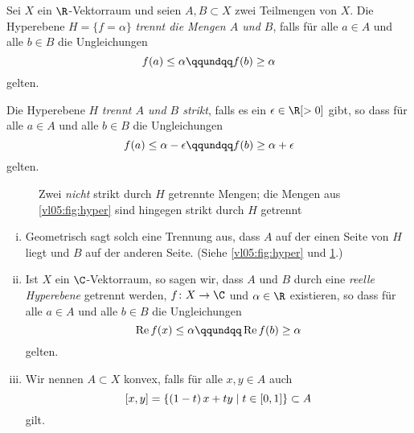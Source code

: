 \begin{thDef}
    Sei $X$ ein $\R$-Vektorraum und seien $A,B\subset X$ zwei Teilmengen von
    $X$. Die Hyperebene $H = \{ f=\alpha \}$ \emph{trennt die Mengen $A$ und
    $B$}, falls für alle $a\in A$ und alle $b\in B$ die Ungleichungen
    \[ f(a) \leq \alpha \qqundqq f(b) \geq \alpha \]
    gelten.
    
    \pagebreak[1]
    Die Hyperebene $H$ \emph{trennt $A$ und $B$ strikt}, falls es ein
    $\epsilon\in\R[>0]$ gibt, so dass für alle $a\in A$ und alle $b\in B$ die
    Ungleichungen
    \[ f(a) \leq \alpha-\epsilon \qqundqq f(b) \geq \alpha+\epsilon \]
    gelten.
    \begin{figure}
        \centering
        \caption{Zwei \emph{nicht} strikt durch $H$ getrennte Mengen;
                 die Mengen aus \cref{vl05:fig:hyper} sind hingegen strikt
                 durch $H$ getrennt}
        \label{vl06:fig:nonstrict}
    \end{figure}
\end{thDef}

\pagebreak[2]
\begin{thBemerkung}\hfill
    \begin{enumerate}[i)]
        \item
            Geometrisch sagt solch eine Trennung aus, dass $A$ auf der einen
            Seite von $H$ liegt und $B$ auf der anderen Seite. (Siehe
            \cref{vl05:fig:hyper} und \cref{vl06:fig:nonstrict}.)
        \item
            Ist $X$ ein $\C$-Vektorraum, so sagen wir, dass $A$ und $B$ durch
            eine \emph{reelle Hyperebene} getrennt werden, $f\colon X\to\C$ und
            $\alpha\in\R$ existieren, so dass für alle $a\in A$ und alle 
            $b\in B$ die Ungleichungen
            \[ \Re f(x) \leq \alpha \qqundqq \Re f(b) \geq \alpha \]
            gelten. %
        \item
            Wir nennen $A\subset X$ konvex, falls für alle $x,y\in A$ auch
            \[ [x,y] = \{ (1-t)\,x + ty \Mid t\in\I \} \subset A \]
            gilt.
    \end{enumerate}
\end{thBemerkung}

